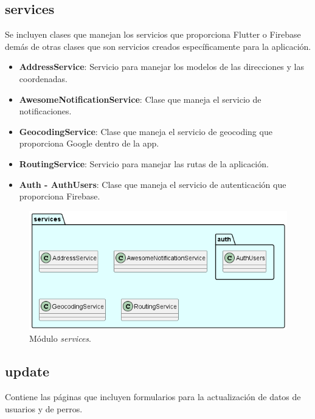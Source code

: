 \documentclass[a4paper, 12pt]{article}
\begin{document}
\subsection*{services}

Se incluyen clases que manejan los servicios que proporciona Flutter o Firebase demás de otras clases que son servicios creados específicamente para la aplicación.

\begin{itemize}[noitemsep]
	\item \textbf{AddressService}: Servicio para manejar los modelos de las direcciones y las coordenadas.
	\item \textbf{AwesomeNotificationService}: Clase que maneja el servicio de notificaciones. 
	\item \textbf{GeocodingService}: Clase que maneja el servicio de geocoding que proporciona Google dentro de la app.
	\item \textbf{RoutingService}:  Servicio para manejar las rutas de la aplicación.
	\item \textbf{Auth - AuthUsers}:  Clase que maneja el servicio de autenticación que proporciona Firebase.
\end{itemize}



\begin{figure}[H]
	\begin{center}
		{\includegraphics[width=0.8\linewidth]{diagram/Services.png}\par}
		\caption{Módulo  \textit{services}.}
	\end{center}
\end{figure}

\subsection*{update}

Contiene las páginas que incluyen formularios para la actualización de datos de usuarios y de perros.
\end{document}
